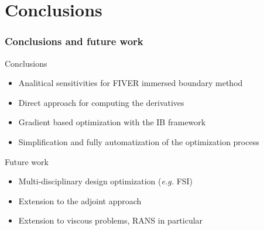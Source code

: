 \section{Conclusions}

\begin{frame}
  \frametitle{Conclusions and future work}
    \begin{block}{Conclusions}
      \begin{itemize}
      \item Analitical sensitivities for FIVER immersed boundary method
      \item Direct approach for computing the derivatives        
      \item Gradient based optimization with the IB framework
      \item Simplification and fully automatization of the optimization process
      \end{itemize}
      \end{block}
    \begin{block}{Future work}
      \begin{itemize}
      \item Multi-disciplinary design optimization (\emph{e.g.} FSI)
      \item Extension to the adjoint approach
      \item Extension to viscous problems, RANS in particular 
      \end{itemize}
      \end{block}
\end{frame}